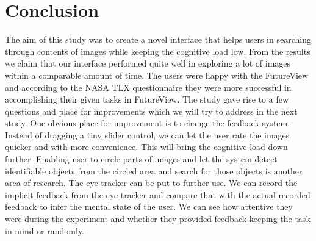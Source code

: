 \documentclass[english]{tktltiki}
\begin{document}
\section{Conclusion}

The aim of this study was to create a novel interface that helps users in searching through contents of images while keeping the cognitive load low. From the results we claim that our interface performed quite well in exploring a lot of images within a comparable amount of time. The users were happy with the FutureView and according to the NASA TLX questionnaire they were more successful in accomplishing their given tasks in FutureView. The study gave rise to a few questions and place for improvements which we will try to address in the next study. One obvious place for improvement is to change the feedback system. Instead of dragging a tiny slider control, we can let the user rate the images quicker and with more convenience. This will bring the cognitive load down further. Enabling user to circle parts of images and let the system detect identifiable objects from the circled area and search for those objects is another area of research. The eye-tracker can be put to further use. We can record the implicit feedback from the eye-tracker and compare that with the actual recorded feedback to infer the mental state of the user. We can see how attentive they were during the experiment and whether they provided feedback keeping the task in mind or randomly.


\end{document}
